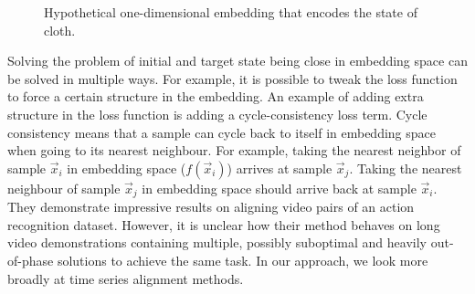 \documentclass[\home/main.tex]{subfiles}
\begin{document}
\newlength\axissep %
\setlength\axissep{1em}
\newlength\tickl %
\setlength\tickl{4mm}
\newlength\ltickl %
\setlength\ltickl{3mm}
\def\miny{0}%

\begin{figure} [htb]
    \centering

    \caption{Hypothetical one-dimensional embedding that encodes the state of cloth.}
    \label{fig:rewards_1d_embd_example}
\end{figure}

Solving the problem of initial and target state being close in embedding space can be solved in multiple ways. For example, it is possible to tweak the loss function to force a certain structure in the embedding. An example of adding extra structure in the loss function is adding a cycle-consistency loss \autocite{Dwibedi2019cycle} term. Cycle consistency means that a sample can cycle back to itself in embedding space when going to its nearest neighbour. For example, taking the nearest neighbor of sample $\vec{x}_i$ in embedding space ($f(\vec{x}_i)$) arrives at sample $\vec{x}_j$. Taking the nearest neighbour of sample $\vec{x}_j$ in embedding space should arrive back at sample $\vec{x}_i$. They demonstrate impressive results on aligning video pairs of an action recognition dataset. However, it is unclear how their method behaves on long video demonstrations containing multiple, possibly suboptimal and heavily out-of-phase solutions to achieve the same task. In our approach, we look more broadly at time series alignment methods.
\end{document}
